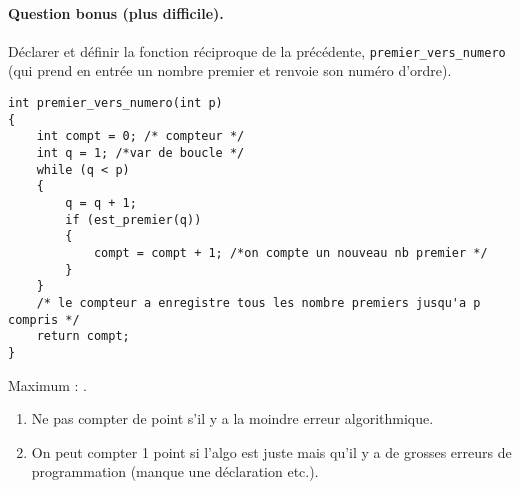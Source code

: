 \paragraph{Question bonus (plus difficile).}
Déclarer et définir la fonction réciproque de la précédente,
\verb+premier_vers_numero+  (qui prend
en entrée un nombre premier et renvoie son numéro d'ordre).

\begin{correction}
  \begin{small}
\begin{verbatim}
int premier_vers_numero(int p)
{
    int compt = 0; /* compteur */
    int q = 1; /*var de boucle */
    while (q < p)
    {
        q = q + 1;
        if (est_premier(q))
        {
            compt = compt + 1; /*on compte un nouveau nb premier */
        }
    }
    /* le compteur a enregistre tous les nombre premiers jusqu'a p compris */
    return compt;    
}
\end{verbatim}
  \end{small}
\end{correction}

\begin{baremeenv}

Maximum : .
  \begin{enumerate}[ (a)]
  \item {} Ne pas compter de point s'il y a la moindre erreur
    algorithmique. 
\item {} On peut compter 1 point si l'algo est juste mais
    qu'il y a de grosses erreurs de programmation (manque une déclaration etc.).
  \end{enumerate}
\end{baremeenv}



